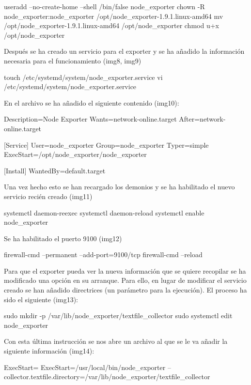 \documentclass[12pt]{article}
\begin{document}
\begin{icodeblock}[bash]
useradd --no-create-home --shell /bin/false node_exporter
chown -R node_exporter:node_exporter /opt/node_exporter-1.9.1.linux-amd64
mv /opt/node_exporter-1.9.1.linux-amd64 /opt/node_exporter
chmod u+x /opt/node_exporter
\end{icodeblock}

Después se ha creado un servicio para el exporter y se ha añadido la información necesaria para el funcionamiento (img8, img9)

\begin{icodeblock}[bash]
touch /etc/systemd/system/node_exporter.service
vi /etc/systemd/system/node_exporter.service
\end{icodeblock}

En el archivo se ha añadido el siguiente contenido (img10):

\begin{icodeblock}[bash]
[Unit]
Description=Node Exporter
Wants=network-online.target
After=network-online.target

[Service]
User=node_exporter
Group=node_exporter
Typer=simple
ExecStart=/opt/node_exporter/node_exporter

[Install]
WantedBy=default.target
\end{icodeblock}

Una vez hecho esto se han recargado los demonios y se ha habilitado el nuevo servicio recién creado (img11)

\begin{icodeblock}
systemctl daemon-reexec
systemctl daemon-reload
systemctl enable node_exporter
\end{icodeblock}

Se ha habilitado el puerto 9100 (img12)

\begin{icodeblock}[bash]
firewall-cmd --permanent --add-port=9100/tcp
firewall-cmd --reload
\end{icodeblock}

Para que el exporter pueda ver la nueva información que se quiere recopilar se ha modificado una opción en su arranque. Para ello, en lugar de modificar el servicio creado se han añadido directrices (un parámetro para la ejecución). El proceso ha sido el siguiente (img13):
\begin{icodeblock}[bash]
sudo mkdir -p /var/lib/node_exporter/textfile_collector
sudo systemctl edit node_exporter
\end{icodeblock}
Con esta última instrucción se nos abre un archivo al que se le va añadir la siguiente información (img14):
\begin{icodeblock}[bash]
[Service]
ExecStart=
ExecStart=/usr/local/bin/node_exporter --collector.textfile.directory=/var/lib/node_exporter/textfile_collector
\end{icodeblock}
\end{document}
